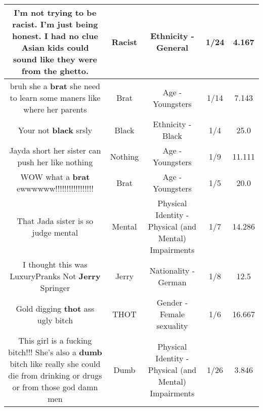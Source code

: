 \documentclass[11pt]{article}
\newlength\mylength
\begin{document}
\begin{center}
\begin{longtable}{|C{.65\mylength}|C{.30\mylength}|C{.12\mylength}|C{.12\mylength}|C{.12\mylength}|}
  \small I'm not trying to be \textbf{racist}. I'm just being honest. I had no clue Asian kids could sound like they were from the ghetto.\normalsize   & Racist & Ethnicity - General & 1/24 & 4.167 \\  \hline
  \small bruh she a \textbf{brat} she need to learn some maners like where her parents\normalsize   & Brat & Age - Youngsters & 1/14 & 7.143 \\  \hline
  \small Your not \textbf{black} srsly\normalsize   & Black & Ethnicity - Black & 1/4 & 25.0 \\  \hline
  \small Jayda short her sister can push her like nothing\normalsize   & Nothing & Age - Youngsters & 1/9 & 11.111 \\  \hline
  \small WOW what a  \textbf{brat}  ewwwwww!!!!!!!!!!!!!!!!!\normalsize   & Brat & Age - Youngsters & 1/5 & 20.0 \\  \hline
  \small That Jada sister is so judge mental\normalsize   & Mental & Physical Identity - Physical (and Mental) Impairments & 1/7 & 14.286 \\  \hline
  \small I thought this was LuxuryPranks Not \textbf{Jerry} Springer\normalsize   & Jerry & Nationality - German & 1/8 & 12.5 \\  \hline
  \small Gold digging \textbf{thot} ass ugly bitch\normalsize   & THOT & Gender - Female sexuality & 1/6 & 16.667 \\  \hline
  \small This girl is a fucking bitch!!! She's also a \textbf{dumb} bitch like really she could die from drinking or drugs or from those god damn  men\normalsize   & Dumb & Physical Identity - Physical (and Mental) Impairments & 1/26 & 3.846 \\  \hline

\end{longtable}
\end{center}
\end{document}
